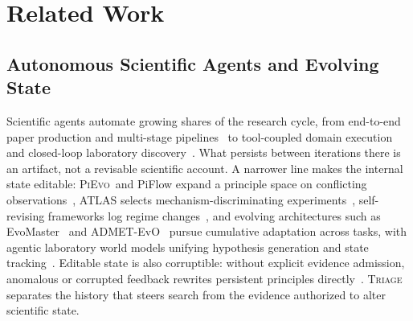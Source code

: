 \documentclass{article}
\newcommand{\triage}{\textsc{Triage}\,}
\newcommand{\pievo}{\textsc{PiEvo}\,}
\begin{document}
\section{Related Work}
\label{sec:related}

\subsection{Autonomous Scientific Agents and Evolving State}
Scientific agents automate growing shares of the research cycle, from end-to-end paper production and multi-stage pipelines~\citep{lu2024aiscientist,yamada2025aiscientistv2workshoplevelautomated,tang2025airesearcherautonomousscientificinnovation,schmidgall2025agentlaboratory,gottweis2025aicoscientist} to tool-coupled domain execution and closed-loop laboratory discovery~\citep{bran2024chemcrow,boiko2023autonomouschemical,ruan2024llmrdf,yang2024moosechem,ghafarollahi2024sciagents,ding2025scitoolagent,ghareeb2026robin,narayanan2024aviary,laurent2024labbench,mitchener2025bixbench,skarlinski2024paperqa2,mitchener2025kosmos}. What persists between iterations there is an artifact, not a revisable scientific account. A narrower line makes the internal state editable: \pievo{} and PiFlow expand a principle space on conflicting observations~\citep{pu2026pievo,pu2026piflowprincipleawarescientificdiscovery}, ATLAS selects mechanism-discriminating experiments~\citep{elteto2026atlas}, self-revising frameworks log regime changes~\citep{wang2026selfrevising}, and evolving architectures such as EvoMaster~\citep{zhu2026evomaster} and ADMET-EvO~\citep{zhou2026admetevo} pursue cumulative adaptation across tasks, with agentic laboratory world models unifying hypothesis generation and state tracking~\citep{fu2026agenticlab}. Editable state is also corruptible: without explicit evidence admission, anomalous or corrupted feedback rewrites persistent principles directly~\citep{riosgarcia2026aiscientistsproduceresults,kirgis2026openendedresearch}. \triage{} separates the history that steers search from the evidence authorized to alter scientific state.
\end{document}
